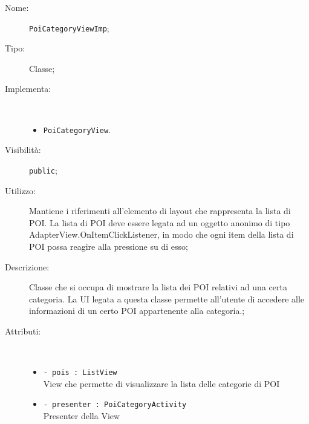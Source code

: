 \documentclass[../DefinizioneDiProdotto.tex]{subfiles}
\begin{document}
\begin{description}
	\item[Nome:] \texttt{PoiCategoryViewImp};
	\item[Tipo:] Classe;
	\item[Implementa:] \
	\begin{itemize}
		\item \texttt{PoiCategoryView}.
		
	\end{itemize}
	\item[Visibilità:] \texttt{public};
	\item[Utilizzo:] Mantiene i riferimenti all'elemento di layout che rappresenta la lista di POI. La lista di POI deve essere legata ad un oggetto anonimo di tipo AdapterView.OnItemClickListener, in modo che ogni item della lista di POI possa reagire alla pressione su di esso;
	\item[Descrizione:] Classe che si occupa di mostrare la lista dei POI relativi ad una certa categoria. La UI legata a questa classe permette all'utente di accedere alle informazioni di un certo POI appartenente alla categoria.;
	\item[Attributi:] \
	\begin{itemize}
		\item \texttt{- pois : ListView}\\
		View che permette di visualizzare la lista delle categorie di POI
		
		\item \texttt{- presenter : PoiCategoryActivity}\\
		Presenter della View
		

\end{itemize}
\end{description}
\end{document}
